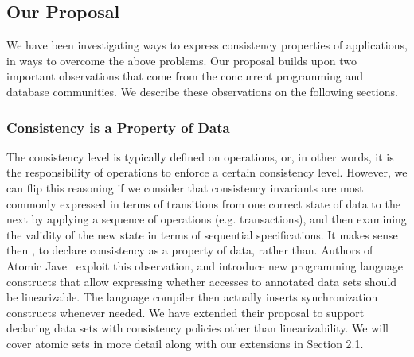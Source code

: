 
\subsection{Our Proposal}
We have been investigating ways to express consistency properties of
applications, in ways to overcome the above problems. Our proposal builds upon
two important observations that come from the concurrent programming and
database communities. We describe these observations on the following sections.  

\subsubsection{Consistency is a Property of Data}
The consistency level is typically defined on operations, or, in other words, it
is the responsibility of operations to enforce a certain consistency level.
However, we can flip this reasoning if we consider that consistency
invariants are most commonly expressed in terms of transitions from one correct
state of data to the next by applying a sequence of operations (e.g.
transactions), and then examining the validity of the new state
in terms of sequential specifications. It makes sense then , to declare
consistency as a property of data, rather than. Authors of Atomic Jave~\cite{Vaziri:2006:ASC:1111320.1111067} exploit this observation, and
introduce new programming language constructs that allow expressing whether
accesses to annotated data sets should be linearizable. The language compiler
then actually inserts synchronization constructs whenever needed. We have extended
their proposal to support declaring data sets with consistency policies other
than linearizability. We will cover atomic sets in more detail along with our
extensions in Section 2.1. \\

